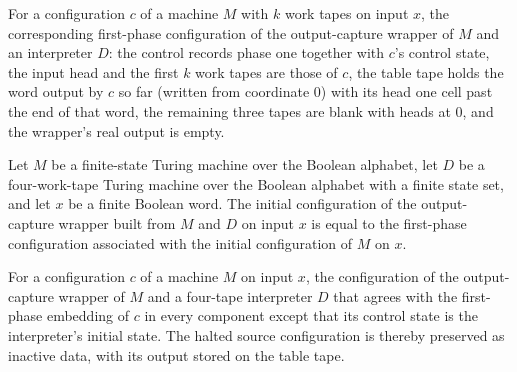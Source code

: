 \begin{definition}
\label{Turing.universalCaptureCfg}
\leanok
{}
For a configuration $c$ of a machine $M$ with $k$ work tapes on input $x$,
the corresponding first-phase configuration of the output-capture wrapper of
$M$ and an interpreter $D$: the control records phase one together with $c$'s
control state, the input head and the first $k$ work tapes are those of $c$,
the table tape holds the word output by $c$ so far (written from coordinate
$0$) with its head one cell past the end of that word, the remaining three
tapes are blank with heads at $0$, and the wrapper's real output is empty.
\end{definition}

\begin{lemma}
\label{Turing.universalCapture_init}
\leanok
{}
Let $M$ be a finite-state Turing machine over the Boolean alphabet, let $D$ be a
four-work-tape Turing machine over the Boolean alphabet with a finite state set, and let
$x$ be a finite Boolean word. The initial configuration of the output-capture wrapper
built from $M$ and $D$ on input $x$ is equal to the first-phase configuration associated
with the initial configuration of $M$ on $x$.
\end{lemma}

\begin{definition}
\label{Turing.universalCapturedCfg}
\leanok
{}
For a configuration $c$ of a machine $M$ on input $x$, the configuration of
the output-capture wrapper of $M$ and a four-tape interpreter $D$ that agrees
with the first-phase embedding of $c$ in every component except that its
control state is the interpreter's initial state.  The halted source
configuration is thereby preserved as inactive data, with its output stored
on the table tape.
\end{definition}

